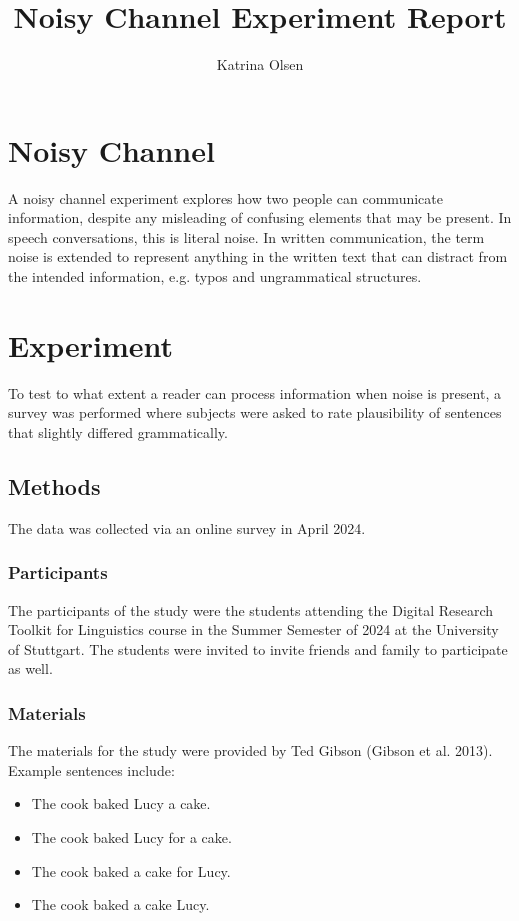 \documentclass[12pt,a4paper]{article}
\author{Katrina Olsen}
\title{Noisy Channel Experiment Report}
\begin{document}
\maketitle

\tableofcontents

\section{Noisy Channel}
A noisy channel experiment explores how two people can communicate information, despite any misleading of confusing elements that may be present. In speech conversations, this is literal noise. In written communication, the term noise is extended to represent anything in the written text that can distract from the intended information, e.g. typos and ungrammatical structures.
\section{Experiment}
To test to what extent a reader can process information when noise is present, a survey was performed where subjects were asked to rate plausibility of sentences that slightly differed grammatically.
\subsection{Methods}
The data was collected via an online survey in April 2024.
\subsubsection{Participants}
The participants of the study were the students attending the Digital Research Toolkit for Linguistics course in the Summer Semester of 2024 at the University of Stuttgart. The students were invited to invite friends and family to participate as well.
\subsubsection{Materials}
The materials for the study were provided by Ted Gibson (Gibson et al. 2013). Example sentences include:
\begin{itemize}
  \item The cook baked Lucy a cake.
  \item The cook baked Lucy for a cake.
  \item The cook baked a cake for Lucy.
  \item The cook baked a cake Lucy.
\end{itemize}
\end{document}

